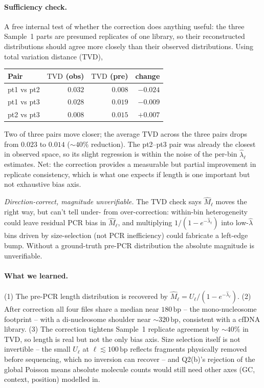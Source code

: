 \documentclass[11pt,a4paper]{article}
\newcommand{\hlam}{\hat{\lambda}}
\newcommand{\hM}{\hat{M}}
\newcommand{\TVD}{\mathrm{TVD}}
\begin{document}
\paragraph{Sufficiency check.}
A free internal test of whether the correction does anything useful: the three
Sample~1 parts are presumed replicates of one library, so their reconstructed
distributions should agree more closely than their observed distributions. Using
total variation distance ($\TVD$),
\begin{center}
\renewcommand{\arraystretch}{1.1}
\begin{tabular}{lrrr}
\textbf{Pair} & $\TVD$ \textbf{(obs)} & $\TVD$ \textbf{(pre)} & \textbf{change} \\\hline
pt1 vs pt2 & $0.032$ & $0.008$ & $-0.024$ \\
pt1 vs pt3 & $0.028$ & $0.019$ & $-0.009$ \\
pt2 vs pt3 & $0.008$ & $0.015$ & $+0.007$ \\
\end{tabular}
\end{center}
Two of three pairs move closer; the average $\TVD$ across the three pairs drops
from $0.023$ to $0.014$ ($\sim 40\%$ reduction). The pt2--pt3 pair was already
the closest in observed space, so its slight regression is within the noise of
the per-bin $\hlam_\ell$ estimates. Net: the correction provides a measurable
but partial improvement in replicate consistency, which is what one expects if
length is one important but not exhaustive bias axis.

\emph{Direction-correct, magnitude unverifiable.} The $\TVD$ check says
$\hat M_\ell$ moves the right way, but can't tell under- from over-correction:
within-bin heterogeneity could leave residual PCR bias in $\hat M_\ell$, and
multiplying $1/(1-e^{-\hlam_\ell})$ into low-$\hlam$ bins driven by
size-selection (not PCR inefficiency) could fabricate a left-edge bump. Without
a ground-truth pre-PCR distribution the absolute magnitude is unverifiable.

\paragraph{What we learned.}
(1) The pre-PCR length distribution is recovered by $\hM_\ell =
U_\ell/(1-e^{-\hlam_\ell})$. (2) After correction all four files share a median
near $180\,\text{bp}$ -- the mono-nucleosome footprint -- with a
di-nucleosome shoulder near $\sim 320\,\text{bp}$, consistent with a cfDNA
library. (3) The correction tightens Sample~1 replicate agreement by $\sim 40\%$
in $\TVD$, so length is real but not the only bias axis. Size selection itself
is not invertible -- the small $U_\ell$ at $\ell \lesssim 100\,\text{bp}$
reflects fragments physically removed before sequencing, which no inversion can
recover -- and Q2(b)'s rejection of the global Poisson means absolute molecule
counts would still need other axes (GC, context, position) modelled in.
\end{document}
